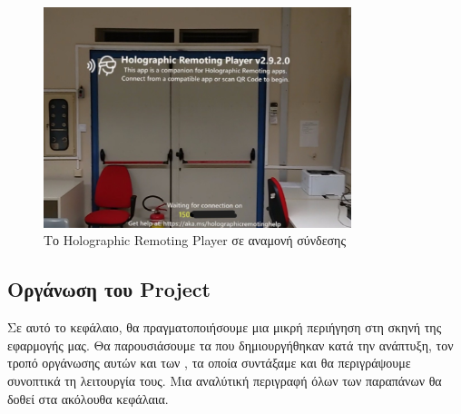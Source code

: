 \begin{figure}[!h]
    \centering
    \includegraphics[width=0.8\textwidth]{images/develop_holographicRemotingPlayer.jpg}
    \caption{Το Holographic Remoting Player σε αναμονή σύνδεσης}\label{fig:developHolographicRemotingPlayer}
\end{figure}

\subsection{Οργάνωση του Project}\label{subsec:developOrganization}
Σε αυτό το κεφάλαιο, θα πραγματοποιήσουμε μια μικρή περιήγηση στη σκηνή της εφαρμογής μας. Θα παρουσιάσουμε τα  που δημιουργήθηκαν κατά την ανάπτυξη, τον τροπό οργάνωσης αυτών και των , τα οποία συντάξαμε και θα περιγράψουμε συνοπτικά τη λειτουργία τους. Μια αναλύτική περιγραφή όλων των παραπάνων θα δοθεί στα ακόλουθα κεφάλαια.

